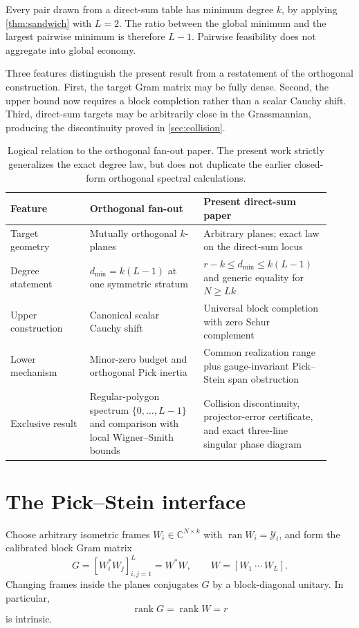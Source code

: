 \documentclass[11pt]{article}
\theoremstyle{definition}
\theoremstyle{remark}
\newcommand{\C}{\mathbb C}
\newcommand{\rank}{\operatorname{rank}}
\newcommand{\ran}{\operatorname{ran}}
\begin{document}
Every pair drawn from a direct-sum table has minimum degree $k$, by applying
\cref{thm:sandwich} with $L=2$.  The ratio between the global minimum and
the largest pairwise minimum is therefore $L-1$.  Pairwise feasibility does
not aggregate into global economy.

Three features distinguish the present result from a restatement of the
orthogonal construction.  First, the target Gram matrix may be fully dense.
Second, the upper bound now requires a block completion rather than a scalar
Cauchy shift.  Third, direct-sum targets may be arbitrarily close in the
Grassmannian, producing the discontinuity proved in \cref{sec:collision}.

\begin{table}[t]
\centering
\caption{Logical relation to the orthogonal fan-out paper.  The present work
strictly generalizes the exact degree law, but does not duplicate the earlier
closed-form orthogonal spectral calculations.}
\label{tab:comparison}
\small
\begin{tabular}{@{}L{0.23\linewidth}L{0.33\linewidth}L{0.36\linewidth}@{}}
\toprule
Feature & Orthogonal fan-out & Present direct-sum paper\\
\midrule
Target geometry & Mutually orthogonal $k$-planes & Arbitrary planes; exact law on the direct-sum locus\\
Degree statement & $d_{\min}=k(L-1)$ at one symmetric stratum & $r-k\le d_{\min}\le k(L-1)$ and generic equality for $N\ge Lk$\\
Upper construction & Canonical scalar Cauchy shift & Universal block completion with zero Schur complement\\
Lower mechanism & Minor-zero budget and orthogonal Pick inertia & Common realization range plus gauge-invariant Pick--Stein span obstruction\\
Exclusive result & Regular-polygon spectrum $\{0,\ldots,L-1\}$ and comparison with local Wigner--Smith bounds & Collision discontinuity, projector-error certificate, and exact three-line singular phase diagram\\
\bottomrule
\end{tabular}
\end{table}

\section{The Pick--Stein interface}\label{sec:interface}

Choose arbitrary isometric frames $W_i\in\C^{N\times k}$ with
$\ran W_i=\mathcal Y_i$, and form the calibrated block Gram matrix
\begin{equation}\label{eq:gram}
 G=[W_i^*W_j]_{i,j=1}^L=W^*W,
 \qquad W=[W_1\ \cdots\ W_L].
\end{equation}
Changing frames inside the planes conjugates $G$ by a block-diagonal unitary.
In particular,
\begin{equation}\label{eq:gram-rank}
                      \rank G=\rank W=r
\end{equation}
is intrinsic.
\end{document}
